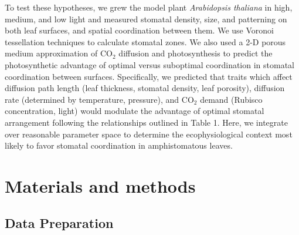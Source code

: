 \documentclass[webpdf,large,modern,unnumsec,namedate]{oup-authoring-template}
\begin{document}
To test these hypotheses, we grew the model plant \emph{Arabidopsis
thaliana} in high, medium, and low light and measured stomatal density,
size, and patterning on both leaf surfaces, and spatial coordination
between them. We use Voronoi tessellation techniques to calculate
stomatal zones. We also used a 2-D porous medium approximation of
CO\(_2\) diffusion and photosynthesis to predict the photosynthetic
advantage of optimal versus suboptimal coordination in stomatal
coordination between surfaces. Specifically, we predicted that traits
which affect diffusion path length (leaf thickness, stomatal density,
leaf porosity), diffusion rate (determined by temperature, pressure),
and CO\(_2\) demand (Rubisco concentration, light) would modulate the
advantage of optimal stomatal arrangement following the relationships
outlined in Table 1. Here, we integrate over reasonable parameter space
to determine the ecophysiological context most likely to favor stomatal
coordination in amphistomatous leaves.

\section{Materials and methods}\label{materials-and-methods}

\subsection{Data Preparation}\label{data-preparation}
\end{document}
